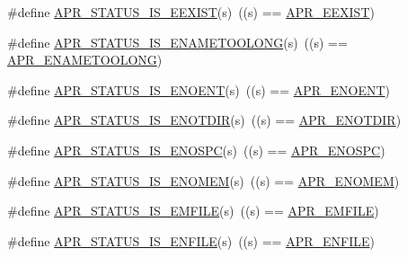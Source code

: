 \begin{DoxyCompactItemize}
\item 
\#define \hyperlink{group___a_p_r___s_t_a_t_u_s___i_s_ga37707a0f41b084f1ce1a13575f4f21db}{A\-P\-R\-\_\-\-S\-T\-A\-T\-U\-S\-\_\-\-I\-S\-\_\-\-E\-E\-X\-I\-S\-T}(s)~((s) == \hyperlink{group___a_p_r___error_gafa7f353804388017a0ea71bc14f0dda5}{A\-P\-R\-\_\-\-E\-E\-X\-I\-S\-T})
\item 
\#define \hyperlink{group___a_p_r___s_t_a_t_u_s___i_s_gad39fb68ea626722634f81a764b3626df}{A\-P\-R\-\_\-\-S\-T\-A\-T\-U\-S\-\_\-\-I\-S\-\_\-\-E\-N\-A\-M\-E\-T\-O\-O\-L\-O\-N\-G}(s)~((s) == \hyperlink{group___a_p_r___error_ga3db63b16c2b332efe441e2661f593377}{A\-P\-R\-\_\-\-E\-N\-A\-M\-E\-T\-O\-O\-L\-O\-N\-G})
\item 
\#define \hyperlink{group___a_p_r___s_t_a_t_u_s___i_s_gad15c3b9bda78a88c02466a0d405c6047}{A\-P\-R\-\_\-\-S\-T\-A\-T\-U\-S\-\_\-\-I\-S\-\_\-\-E\-N\-O\-E\-N\-T}(s)~((s) == \hyperlink{group___a_p_r___error_gacc26a4afe01b6cc141f839be71fddf1c}{A\-P\-R\-\_\-\-E\-N\-O\-E\-N\-T})
\item 
\#define \hyperlink{group___a_p_r___s_t_a_t_u_s___i_s_gace6923483aa351b05b8f41e0bdb1df60}{A\-P\-R\-\_\-\-S\-T\-A\-T\-U\-S\-\_\-\-I\-S\-\_\-\-E\-N\-O\-T\-D\-I\-R}(s)~((s) == \hyperlink{group___a_p_r___error_gacfaa73cea75d14d49cc5c81e6c494330}{A\-P\-R\-\_\-\-E\-N\-O\-T\-D\-I\-R})
\item 
\#define \hyperlink{group___a_p_r___s_t_a_t_u_s___i_s_ga5c77e7bb1de1b6ec319f2a42eb80be1e}{A\-P\-R\-\_\-\-S\-T\-A\-T\-U\-S\-\_\-\-I\-S\-\_\-\-E\-N\-O\-S\-P\-C}(s)~((s) == \hyperlink{group___a_p_r___error_ga1dfc0bbf080f17b0b9010ef967542193}{A\-P\-R\-\_\-\-E\-N\-O\-S\-P\-C})
\item 
\#define \hyperlink{group___a_p_r___s_t_a_t_u_s___i_s_ga38ab0ab9f00c849f24aae626f5118fce}{A\-P\-R\-\_\-\-S\-T\-A\-T\-U\-S\-\_\-\-I\-S\-\_\-\-E\-N\-O\-M\-E\-M}(s)~((s) == \hyperlink{group___a_p_r___error_ga6a453e60000000609a95817efabebf4f}{A\-P\-R\-\_\-\-E\-N\-O\-M\-E\-M})
\item 
\#define \hyperlink{group___a_p_r___s_t_a_t_u_s___i_s_gae50825e6293023c570a92d185b38e393}{A\-P\-R\-\_\-\-S\-T\-A\-T\-U\-S\-\_\-\-I\-S\-\_\-\-E\-M\-F\-I\-L\-E}(s)~((s) == \hyperlink{group___a_p_r___error_gaec391eaf0bfa6aed03457ed3f796942d}{A\-P\-R\-\_\-\-E\-M\-F\-I\-L\-E})
\item 
\#define \hyperlink{group___a_p_r___s_t_a_t_u_s___i_s_ga4274ec4c91423ae54ab8a1d53991fb76}{A\-P\-R\-\_\-\-S\-T\-A\-T\-U\-S\-\_\-\-I\-S\-\_\-\-E\-N\-F\-I\-L\-E}(s)~((s) == \hyperlink{group___a_p_r___error_gaf46f59147b00c2c87d76b9eb75674456}{A\-P\-R\-\_\-\-E\-N\-F\-I\-L\-E})

\end{DoxyCompactItemize}
